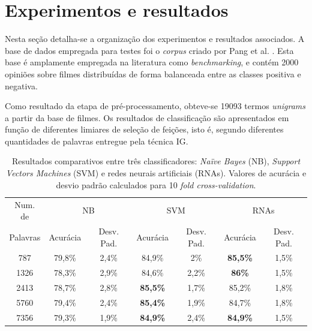 \documentclass[11pt,a4paper]{article}
\begin{document}
\section{Experimentos e resultados}\label{sec:results}


Nesta seção detalha-se a organização dos experimentos e resultados associados. A base de dados empregada para testes foi o \textit{corpus} criado por Pang et al. \cite{Pang04:Subjectivity}. Esta base é amplamente empregada na literatura como \textit{benchmarking}, e contém 2000 opiniões sobre filmes distribuídas de forma balanceada entre as classes positiva e negativa.

Como resultado da etapa de pré-processamento, obteve-se 19093 termos \textit{unigrams} a partir da base de filmes. Os resultados de classificação são apresentados em função de diferentes limiares de seleção de feições, isto é, segundo diferentes quantidades de palavras entregue pela técnica IG.

\begin{table}[h]
	\caption{Resultados comparativos entre três classificadores: \textit{Naïve Bayes} (NB), \textit{Support Vectors Machines} (SVM) e redes neurais artificiais (RNAs). Valores de acurácia e desvio padrão calculados para 10 \textit{fold cross-validation}.  \label{tab:results}}
\begin{center}
	\begin{tabular}{c | c c | c c | c c}
		\hline
		Num. de & \multicolumn{2}{c}{NB} & \multicolumn{2}{|c}{SVM} & \multicolumn{2}{|c}{RNAs}\\
		Palavras & Acurácia & Desv. Pad.& Acurácia & Desv. Pad.& Acurácia & Desv. Pad.\\		 \cline{2-2}
		\hline \hline
		  787 & 79,8\% & 2,4\% & 84,9\% & 2\% & \textbf{85,5\%} & 1,5\% \\ 	
	   1326 & 78,3\% & 2,9\% & 84,6\% & 2,2\% & \textbf{86\%} & 1,5\% \\ 	
	   2413 & 78,7\% & 2,8\% & \textbf{85,5\%} & 1,7\% & 85,2\% & 1,8\% \\ 	
	   5760 & 79,4\% & 2,4\% & \textbf{85,4\%} & 1,9\% & 84,7\% & 1,8\% \\ 	
     7356 & 79,3\% & 1,9\% & \textbf{84,9\%} & 2,4\% & \textbf{84,9\%} & 1,5\% \\	
		\hline
	\end{tabular}
\end{center}
\end{table}
\end{document}

